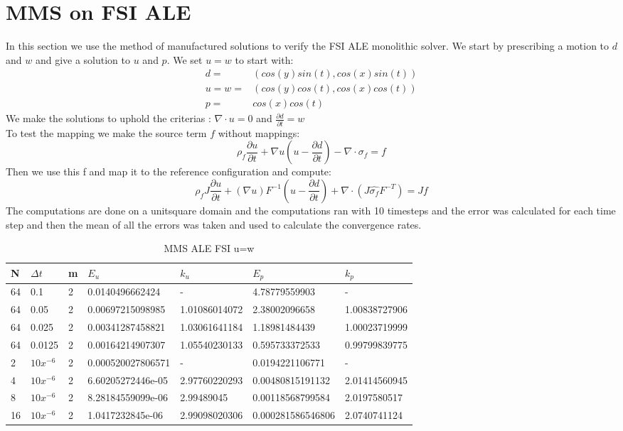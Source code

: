\section{MMS on FSI ALE}
In this section we use the method of manufactured solutions to verify the FSI ALE monolithic solver. We start by prescribing a motion to $ d$ and $w$ and give a solution to $u$ and $p$. We set $u = w$ to start with:
\begin{align*}
d =& ( cos(y)sin(t) , cos(x)sin(t) )\\
u = w=& ( cos(y)cos(t), cos(x)cos(t) ) \\
p =& cos(x)cos(t)
\end{align*}
We make the solutions to uphold the criterias : $ \nabla \cdot u =0  $ and $ \frac{\partial d}{\partial t} = w  $ \\

To test the mapping we make the source term $f$ without mappings:
$$ \rho_f \frac{\partial u}{\partial t}  +  \nabla u (u-\frac{\partial d}{\partial t})  -  \nabla \cdot \sigma_f  = f $$
Then we use this f and map it to the reference configuration and compute:
$$ \rho_f J \frac{\partial u}{\partial t} + (\nabla u)F^{-1}(u-\frac{\partial d}{\partial t})  + \nabla \cdot( J \hat{\sigma_f} F^{-T}) = J f$$
The computations are done on a unitsquare domain and the computations ran with 10 timesteps and the error was calculated for each time step and then the mean of all the errors was taken and used to calculate the convergence rates.
\begin{table}[h!]
\centering
\caption{MMS ALE FSI u=w}
\label{my-label}
\begin{tabular}{|l|l|l|l|l|l|l|}
\hline
N & $\Delta t$ & m & $E_u$ & $k_u$ & $E_p$ & $k_p$ \\ \hline
64 & 0.1 & 2 & 0.0140496662424 & - & 4.78779559903 & - \\ \hline
64 & 0.05 & 2 & 0.00697215098985 & 1.01086014072 & 2.38002096658 & 1.00838727906 \\ \hline
64 & 0.025 & 2 & 0.00341287458821 & 1.03061641184 & 1.18981484439 & 1.00023719999 \\ \hline
64 & 0.0125 & 2 & 0.00164214907307 & 1.05540230133 & 0.595733372533 & 0.99799839775 \\ \hline
2 & $10x^{-6}$ & 2 & 0.000520027806571 & - & 0.0194221106771 & - \\ \hline
4 & $10x^{-6}$ & 2 & 6.60205272446e-05 & 2.97760220293 & 0.00480815191132 & 2.01414560945 \\ \hline
8 & $10x^{-6}$ & 2 & 8.28184559099e-06 & 2.99489045 & 0.00118568799584 & 2.0197580517 \\ \hline
16 & $10x^{-6}$ & 2 & 1.0417232845e-06 & 2.99098020306 & 0.000281586546806 & 2.0740741124 \\ \hline
\end{tabular}
\end{table}





\newpage













